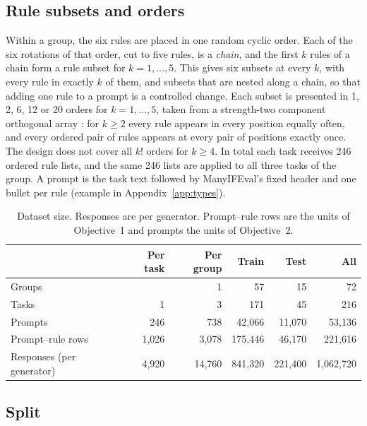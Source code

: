 \documentclass[10pt]{article}
\begin{document}
\subsection{Rule subsets and orders}

Within a group, the six rules are placed in one random cyclic order. Each of the six rotations of that order, cut to
five rules, is a \emph{chain}, and the first $k$ rules of a chain form a rule subset for $k=1,\dots,5$. This gives six
subsets at every $k$, with every rule in exactly $k$ of them, and subsets that are nested along a chain, so that adding
one rule to a prompt is a controlled change. Each subset is presented in 1, 2, 6, 12 or 20 orders for $k=1,\dots,5$,
taken from a strength-two component orthogonal array \citep{yang2021coa}: for $k\ge2$ every rule appears in every
position equally often, and every ordered pair of rules appears at every pair of positions exactly once. The design
does not cover all $k!$ orders for $k\ge4$. In total each task receives 246 ordered rule lists, and the same 246 lists
are applied to all three tasks of the group. A prompt is the task text followed by ManyIFEval's fixed header and one
bullet per rule (example in Appendix~\ref{app:types}).

\begin{table}[t]
\centering\small
\caption{Dataset size. Responses are per generator. Prompt--rule rows are the units of Objective~1 and prompts the
units of Objective~2.}
\label{tab:counts}
\begin{tabular}{lrrrrr}
\toprule
 & Per task & Per group & Train & Test & All \\
\midrule
Groups & & 1 & 57 & 15 & 72 \\
Tasks & 1 & 3 & 171 & 45 & 216 \\
Prompts & 246 & 738 & 42,066 & 11,070 & 53,136 \\
Prompt--rule rows & 1,026 & 3,078 & 175,446 & 46,170 & 221,616 \\
Responses (per generator) & 4,920 & 14,760 & 841,320 & 221,400 & 1,062,720 \\
\bottomrule
\end{tabular}
\end{table}

\subsection{Split}
\end{document}
